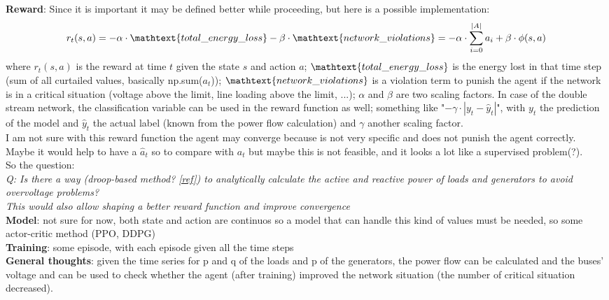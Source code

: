 \noindent \textbf{Reward}: 
Since it is important it may be defined better while proceeding, but here is a possible implementation:
\[
r_t(s,a) = - \alpha \cdot \mathtext{total\_energy\_loss} - \beta \cdot \mathtext{network\_violations} = -
\alpha \cdot \sum^{|A|}_{i=0} a_i + \beta \cdot \phi(s,a)
\]
\noindent where $r_t(s,a)$ is the reward at time $t$ given the state $s$ and action $a$; $\mathtext{total\_energy\_loss}$ is the energy lost in that time step (sum of all curtailed values, basically np.sum($a_t$)); $\mathtext{network\_violations}$ is a violation term to punish the agent if the network is in a critical situation (voltage above the limit, line loading above the limit, ...); $\alpha$ and $\beta$ are two scaling factors. In case of the double stream network, the classification variable can be used in the reward function as well; something like "$- \gamma \cdot |y_t - \hat{y}_t|$", with $y_t$ the prediction of the model and $\hat{y}_t$ the actual label (known from the power flow calculation) and $\gamma$ another scaling factor.\\

I am not sure with this reward function the agent may converge because is not very specific and does not punish the agent correctly. Maybe it would help to have a $\hat{a}_t$ so to compare with $a_t$ but maybe this is not feasible, and it looks a lot like a supervised problem(?).\\
So the question:\\
\emph{Q: Is there a way (droop-based method? \href{https://par.nsf.gov/servlets/purl/10082801}{[ref]}) to analytically calculate the active and reactive power of loads and generators to avoid overvoltage problems? \\
This would also allow shaping a better reward function and improve convergence}\\

\noindent \textbf{Model}: not sure for now, both state and action are continuos so a model that can handle this kind of values must be needed, so some actor-critic method (PPO, DDPG)\\

\noindent \textbf{Training}: some episode, with each episode given all the time steps\\

\noindent \textbf{General thoughts}: given the time series for p and q of the loads and p of the generators, the power flow can be calculated and the buses' voltage and can be used to check whether the agent (after training) improved the network situation (the number of critical situation decreased). \\

